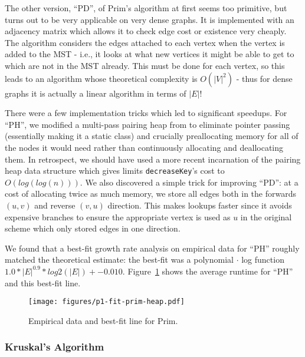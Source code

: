 The other version, ``PD'', of Prim's algorithm at first seems too primitive, but
turns out to be very applicable on very dense graphs.  It is implemented with an
adjacency matrix which allows it to check edge cost or existence very cheaply.
The algorithm considers the edges attached to each vertex when the vertex is
added to the MST - i.e., it looks at what new vertices it might be able to get
to which are not in the MST already.  This must be done for each vertex, so this
leads to an algorithm whose theoretical complexity is $O(|V|^2)$ - thus for
dense graphs it is actually a linear algorithm in terms of $|E|$!

There were a few implementation tricks which led to significant speedups.  For
``PH'', we modified a multi-pass pairing heap from \cite{rui} to eliminate
pointer passing (essentially making it a static class) and crucially
preallocating memory for all of the nodes it would need rather than continuously
allocating and deallocating them.  In retrospect, we should have used a more
recent incarnation of the pairing heap data structure which gives limits
\texttt{decreaseKey}'s cost to $O(log(log(n)))$\cite{elmasry}.  We also
discovered a simple trick for improving ``PD'': at a cost of allocating twice as
much memory, we store all edges both in the forwards $(u, v)$ and reverse $(v,
u)$ direction.  This makes lookups faster since it avoids expensive branches to
ensure the appropriate vertex is used as $u$ in the original scheme which only
stored edges in one direction.

We found that a best-fit growth rate analysis on empirical data for ``PH''
roughly matched the theoretical estimate: the best-fit was a polynomial $\cdot$
log function $1.0 * |E|^0.9 * log2(|E|) + -0.010$.
Figure~\ref{fig:p1-fit-prim-heap} shows the average runtime for ``PH'' and this
best-fit line.

\begin{figure}[htb]
\centering
\texttt{[image: figures/p1-fit-prim-heap.pdf]}
\caption{Empirical data and best-fit line for Prim.}
\label{fig:p1-fit-prim-heap}
\end{figure}

\subsubsection{Kruskal's Algorithm}
\label{sec:deep:algchoice:kruskal}
